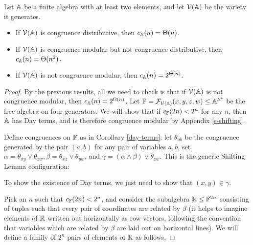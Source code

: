 \documentclass[letterpaper,11pt]{article}
\begin{document}
\begin{thm} Let $\mathbb{A}$ be a finite algebra with at least two elements, and let $\mathcal{V}(\mathbb{A})$ be the variety it generates.
\begin{itemize}
\item If $\mathcal{V}(\mathbb{A})$ is congruence distributive, then $c_{\mathbb{A}}(n) = \Theta(n)$.
\item If $\mathcal{V}(\mathbb{A})$ is congruence modular but not congruence distributive, then $c_{\mathbb{A}}(n) = \Theta(n^2)$.
\item If $\mathcal{V}(\mathbb{A})$ is not congruence modular, then $c_{\mathbb{A}}(n) = 2^{\Theta(n)}$.
\end{itemize}
\end{thm}
\begin{proof} By the previous results, all we need to check is that if $\mathcal{V}(\mathbb{A})$ is not congruence modular, then $c_{\mathbb{A}}(n) = 2^{\Omega(n)}$. Let $\mathbb{F} = \mathcal{F}_{\mathcal{V}(\mathbb{A})}(x,y,z,w) \le \mathbb{A}^{\mathbb{A}^4}$ be the free algebra on four generators. We will show that if $c_{\mathbb{F}}(2n) < 2^n$ for any $n$, then $\mathbb{A}$ has Day terms, and is therefore congruence modular by Appendix \ref{s-shifting}.

Define congruences on $\mathbb{F}$ as in Corollary \ref{day-terms}: let $\theta_{ab}$ be the congruence generated by the pair $(a,b)$ for any pair of variables $a,b$, set $\alpha = \theta_{xy} \vee \theta_{zw}, \beta = \theta_{xz} \vee \theta_{yw}$, and $\gamma = (\alpha \wedge \beta) \vee \theta_{zw}$. This is the generic Shifting Lemma configuration:
\begin{center}
\end{center}
To show the existence of Day terms, we just need to show that $(x,y) \in \gamma$.

Pick an $n$ such that $c_{\mathbb{F}}(2n) < 2^n$, and consider the subalgebra $\mathbb{R} \le \mathbb{F}^{2n}$ consisting of tuples such that every pair of coordinates are related by $\beta$ (it helps to imagine elements of $\mathbb{R}$ written out horizontally as row vectors, following the convention that variables which are related by $\beta$ are laid out on horizontal lines). We will define a family of $2^n$ pairs of elements of $\mathbb{R}$ as follows.


\end{proof}
\end{document}
